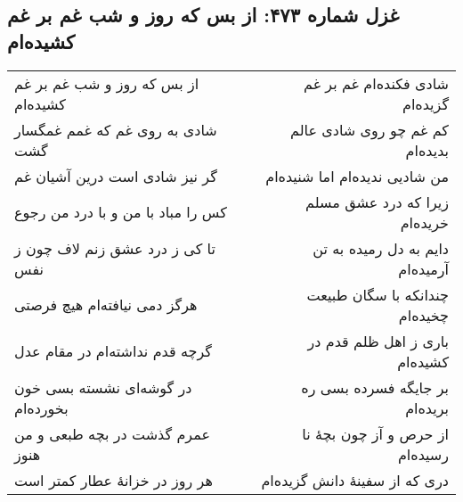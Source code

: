 \begin{center}
\section*{غزل شماره ۴۷۳: از بس که روز و شب غم بر غم کشیده‌ام}
\label{sec:473}
\begin{longtable}{l p{0.5cm} r}
از بس که روز و شب غم بر غم کشیده‌ام
&&
شادی فکنده‌ام غم بر غم گزیده‌ام
\\
شادی به روی غم که غمم غمگسار گشت
&&
کم غم چو روی شادی عالم بدیده‌ام
\\
گر نیز شادی است درین آشیان غم
&&
من شادیی ندیده‌ام اما شنیده‌ام
\\
کس را مباد با من و با درد من رجوع
&&
زیرا که درد عشق مسلم خریده‌ام
\\
تا کی ز درد عشق زنم لاف چون ز نفس
&&
دایم به دل رمیده به تن آرمیده‌ام
\\
هرگز دمی نیافته‌ام هیچ فرصتی
&&
چندانکه با سگان طبیعت چخیده‌ام
\\
گرچه قدم نداشته‌ام در مقام عدل
&&
باری ز اهل ظلم قدم در کشیده‌ام
\\
در گوشه‌ای نشسته بسی خون بخورده‌ام
&&
بر جایگه فسرده بسی ره بریده‌ام
\\
عمرم گذشت در بچه طبعی و من هنوز
&&
از حرص و آز چون بچهٔ نا رسیده‌ام
\\
هر روز در خزانهٔ عطار کمتر است
&&
دری که از سفینهٔ دانش گزیده‌ام
\\
\end{longtable}
\end{center}
